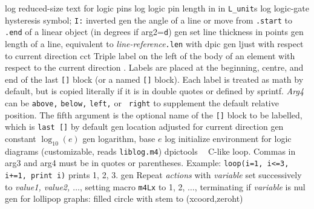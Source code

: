 %
  {log}%
  {reduced-size text for logic pins}%
%
  {log}%
  {logic pin length in in {\tt L\_unit}s}%
%
  {log}%
  {logic-gate hysteresis symbol; {\tt I:} inverted}%
%
  {gen}%
  {the angle of a line or move from {\tt .start} to {\tt .end} of a linear
   object (in degrees if arg2={\tt d})}%
%
  {gen}%
  {set line thickness in points}%
%
  {gen}%
  {length of a line, equivalent to {\sl line-reference}{\tt .len}%
   with dpic}%
%
  {gen}%
  {ljust with respect to current direction}%
%
  {cct}%
  {Triple label on the left of the body of an element with respect to the
    current direction .  Labels are placed at the
    beginning, centre, and end of the last {\tt []} block (or a named
    {\tt []} block). Each label is treated as math by default, but is
    copied literally if it is in double quotes or defined by sprintf.
    {\sl Arg4} can be {\tt above,} {\tt below,} {\tt left,} or {\tt
    right} to supplement the default relative position.  The fifth
    argument is the optional name of the {\tt []} block to be labelled,
    which is {\tt last []} by default}%
%
  {gen}%
  {location adjusted for current direction}%
%
  {gen}%
  {constant $\log_{10}(e)$}%
%
  {gen}%
  {logarithm, base $e$}%
%
  {log}%
  {initialize environment for logic diagrams
    (customizable, reads {\tt liblog.m4})}%
%
  {dpictools}%
  {$\;\;$ C-like loop.  Commas in arg3 and arg4 must
    be in quotes or parentheses. Example:
    {\tt loop(i=1, i<=3, i+=1, print i)} prints 1, 2, 3.}%
%
  {gen}%
  {Repeat {\sl actions} with {\sl variable} set successively to
   {\sl value1, value2, $\ldots$}, setting macro {\tt m4Lx} to 1, 2,
   $\ldots$, terminating if {\sl variable} is nul}%
 {gen}%
  {for lollipop graphs: filled circle with stem to
  (xcoord,zeroht)}%
%
